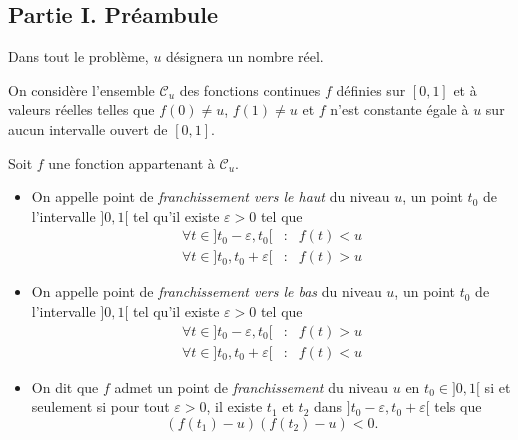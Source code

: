 \subsection*{Partie I. Pr{\'e}ambule}

Dans tout le probl{\`e}me, $u$ d{\'e}signera un nombre r{\'e}el.

On consid{\`e}re l'ensemble $\mathcal{C}_{u}$ des fonctions continues $f$ d{\'e}finies sur $[ 0,1] $ et {\`a} valeurs
r{\'e}elles telles que $f(0)\neq u$, $f(1)\neq u$ et $f$ n'est constante {\'e}gale {\`a} $u$ sur aucun intervalle ouvert de $[0,1] $.

Soit $f$ une fonction appartenant {\`a} $\mathcal{C}_{u}$.

\begin{itemize}
\item  On appelle point de \emph{franchissement vers le haut} du niveau $u$, un point $t_{0}$ de l'intervalle $] 0,1[ $ tel qu'il existe $\varepsilon >0$ tel que
\begin{eqnarray*}
\forall t \in ] t_{0}-\varepsilon ,t_{0}[ &:& f(t)<u \\
\forall t \in ] t_{0},t_{0}+\varepsilon [ &:& f(t)>u
\end{eqnarray*}

\item  On appelle point de \emph{franchissement vers le bas} du niveau $u$, un point $t_{0}$ de l'intervalle $] 0,1[ $ tel qu'il existe $\varepsilon >0$ tel que
\begin{eqnarray*}
\forall t \in ] t_{0}-\varepsilon ,t_{0}[ &:& f(t)>u \\
\forall t \in ] t_{0},t_{0}+\varepsilon [ &:& f(t)<u
\end{eqnarray*}

\item  On dit que $f$ admet un point de \emph{franchissement }du niveau $u$ en $t_{0}\in ] 0,1[ $ si et seulement si pour tout $\varepsilon >0$, il existe $t_{1}$ et $t_{2}$
dans $] t_{0}-\varepsilon,t_{0}+\varepsilon [ $ tels que
\[
(f(t_{1})-u)(f(t_{2})-u)<0.
\]
\end{itemize}

